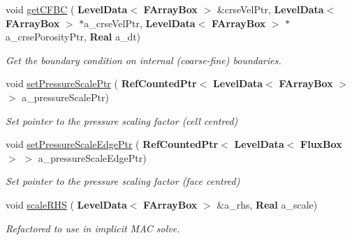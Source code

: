 \begin{DoxyCompactItemize}
\mbox{\label{class_projector_a1c9b0e5180fdb560c77a242eceb1e76c}} 
void \hyperlink{class_projector_a1c9b0e5180fdb560c77a242eceb1e76c}{get\+C\+F\+BC} (\textbf{ Level\+Data}$<$ \textbf{ F\+Array\+Box} $>$ \&crse\+Vel\+Ptr, \textbf{ Level\+Data}$<$ \textbf{ F\+Array\+Box} $>$ $\ast$a\+\_\+crse\+Vel\+Ptr, \textbf{ Level\+Data}$<$ \textbf{ F\+Array\+Box} $>$ $\ast$a\+\_\+crse\+Porosity\+Ptr, \textbf{ Real} a\+\_\+dt)
\begin{DoxyCompactList}\small\item\em Get the boundary condition on internal (coarse-\/fine) boundaries. \end{DoxyCompactList}\item 
\mbox{\label{class_projector_a5f55153d654433b1ac89f831c91925a0}} 
void \hyperlink{class_projector_a5f55153d654433b1ac89f831c91925a0}{set\+Pressure\+Scale\+Ptr} (\textbf{ Ref\+Counted\+Ptr}$<$ \textbf{ Level\+Data}$<$ \textbf{ F\+Array\+Box} $>$ $>$ a\+\_\+pressure\+Scale\+Ptr)
\begin{DoxyCompactList}\small\item\em Set pointer to the pressure scaling factor (cell centred) \end{DoxyCompactList}\item 
\mbox{\label{class_projector_a9e6d2eacd1d226780b5bb89023ba8880}} 
void \hyperlink{class_projector_a9e6d2eacd1d226780b5bb89023ba8880}{set\+Pressure\+Scale\+Edge\+Ptr} (\textbf{ Ref\+Counted\+Ptr}$<$ \textbf{ Level\+Data}$<$ \textbf{ Flux\+Box} $>$ $>$ a\+\_\+pressure\+Scale\+Edge\+Ptr)
\begin{DoxyCompactList}\small\item\em Set pointer to the pressure scaling factor (face centred) \end{DoxyCompactList}\item 
\mbox{\label{class_projector_a7d7b82061bdc9a32f73a214202625ab3}} 
void \hyperlink{class_projector_a7d7b82061bdc9a32f73a214202625ab3}{scale\+R\+HS} (\textbf{ Level\+Data}$<$ \textbf{ F\+Array\+Box} $>$ \&a\+\_\+rhs, \textbf{ Real} a\+\_\+scale)
\begin{DoxyCompactList}\small\item\em Refactored to use in implicit M\+AC solve. \end{DoxyCompactList}\item 

\end{DoxyCompactItemize}
